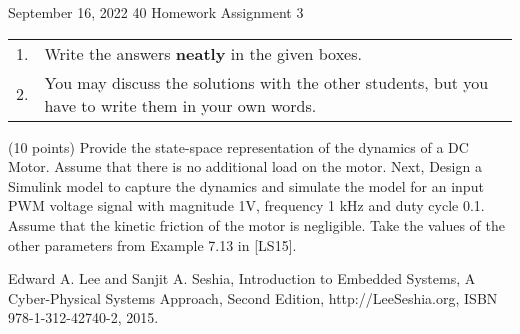 \documentclass[a4paper, 12pt]{article}
\begin{document}
\vspace*{14ex}

           {September 16, 2022}      					         		%
					 {40}											%
					 {Homework Assignment 3}							%
					
\begin{tabular}{cl}
1. & Write the answers \textbf{neatly} in the given boxes.\\
2. & You may  discuss the solutions with the other students, but you have to write them in your own words.\\
\end{tabular}

\begin{problem}{}
(10 points) Provide the state-space representation of the dynamics of a DC Motor. Assume that there is no additional load on the motor. Next, Design a Simulink model to capture the dynamics and simulate the model for an input PWM voltage signal with magnitude 1V, frequency 1 kHz and duty cycle 0.1. Assume that the kinetic friction of the motor is negligible. Take the values of the other parameters from Example 7.13 in [LS15].

\noindent
[LS15] Edward A. Lee and Sanjit A. Seshia, Introduction to Embedded Systems, A Cyber-Physical Systems Approach, Second Edition, http://LeeSeshia.org, ISBN 978-1-312-42740-2, 2015. \\
\\
\begin{minipage}{1\textwidth}
		\rectangle{\linewidth}{18cm}
\end{minipage}
\newpage
\ \\
\begin{minipage}{1\textwidth}
		\rectangle{\linewidth}{24cm}
\end{minipage}
\newpage
\ \\
\begin{minipage}{1\textwidth}
		\rectangle{\linewidth}{24cm}
\end{minipage}
\newpage
\ \\
\begin{minipage}{1\textwidth}
		\rectangle{\linewidth}{24cm}
\end{minipage}
\end{problem}
\end{document}

